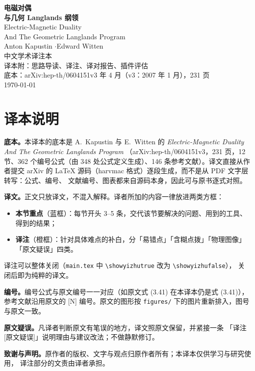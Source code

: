 \begin{titlepage}
\centering
\vspace*{2.2cm}
{\LARGE\bfseries 电磁对偶}\\[10pt]
{\LARGE\bfseries 与几何 Langlands 纲领}\\[28pt]
{\large Electric-Magnetic Duality\\[4pt] And The Geometric Langlands Program}\\[34pt]
{\large Anton Kapustin \quad$\cdot$\quad Edward Witten}\\[26pt]
{\normalsize 中文学术译注本}\\[6pt]
{\small 译本附：思路导读、译注、译对报告、插件评估}\\[40pt]
{\small 底本：arXiv:hep-th/0604151v3  年 4 月（v3：2007 年 1 月），231 页}\\[6pt]
{\small \today}
\vfill
\end{titlepage}

\thispagestyle{empty}
\section*{译本说明}

\noindent\textbf{底本。}本译本的底本是 A.~Kapustin 与 E.~Witten 的
\emph{Electric-Magnetic Duality And The Geometric Langlands Program}
（arXiv:hep-th/0604151v3，231 页，12 节、362 个编号公式（由 348 处公式定义生成）、146 条参考文献）。译文直接从作者提交
arXiv 的 \LaTeX{} 源码（harvmac 格式）逐段生成，而不是从 PDF 文字层转写：公式、编号、
文献编号、图表都来自源码本身，因此可与原书逐式对照。

\medskip
\noindent\textbf{译文。}正文只放译文，不混入解释。译者所加的内容一律放进两类方框：
\begin{itemize}[leftmargin=1.6em,itemsep=2pt,topsep=2pt]
  \item \textbf{本节重点}（蓝框）：每节开头 3--5 条，交代该节要解决的问题、用到的工具、得到的结果；
  \item \textbf{译注}（橙框）：针对具体难点的补白，分「易错点」「含糊点拨」「物理图像」「原文疑误」四类。
\end{itemize}
译注可以整体关闭（\texttt{main.tex} 中 \verb|\showyizhutrue| 改为 \verb|\showyizhufalse|），
关闭后即为纯粹的译文。

\medskip
\noindent\textbf{编号。}编号公式与原文编号一一对应（如原文式 (3.41) 在本译本仍是式 (3.41)），
参考文献沿用原文的 [N] 编号。原文的图形按 \texttt{figures/} 下的图片重新排入，图号与原文一致。

\medskip
\noindent\textbf{原文疑误。}凡译者判断原文有笔误的地方，译文照原文保留，并紧接一条
「译注 [原文疑误]」说明理由与建议改法；不做静默修订。

\medskip
\noindent\textbf{致谢与声明。}原作者的版权、文字与观点归原作者所有；本译本仅供学习与研究使用，
译注部分的文责由译者承担。
